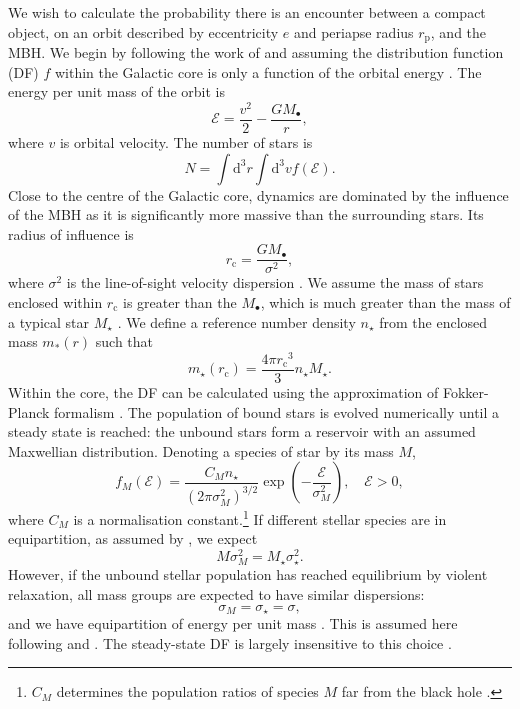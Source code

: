 \documentclass[useAMS,usedcolumn,usegraphicx,usenatbib]{mn2e}
\newcommand{\sub}[1]{\ensuremath{_\mathrm{#1}}}
\newcommand{\dd}{\ensuremath{\mathrm{d}}}
\begin{document}
We wish to calculate the probability there is an encounter between a compact object, on an orbit described by eccentricity $e$ and periapse radius $r\sub{p}$, and the MBH. We begin by following the work of \citet{Bahcall1976, Bahcall1977} and assuming the distribution function (DF) $f$ within the Galactic core is only a function of the orbital energy \citep{Shapiro1978}. The energy per unit mass of the orbit is
\begin{equation}
\mathcal{E} = \frac{v^2}{2} - \frac{GM_\bullet}{r},
\end{equation}
where $v$ is orbital velocity. The number of stars is
\begin{equation}
N = \int \dd^3r \int \dd^3v f(\mathcal{E}).
\end{equation}
Close to the centre of the Galactic core, dynamics are dominated by the influence of the MBH as it is significantly more massive than the surrounding stars. Its radius of influence is
\begin{equation}
r\sub{c} = \frac{GM_\bullet}{\sigma^2},
\label{eq:r_c}
\end{equation}
where $\sigma^2$ is the line-of-sight velocity dispersion \citep{Frank1976}. We assume the mass of stars enclosed within $r\sub{c}$ is greater than the $M_\bullet$, which is much greater than the mass of a typical star $M_\star$ \citep{Bahcall1976}. We define a reference number density $n_\star$ from the enclosed mass $m_\ast(r)$ such that
\begin{equation}
m_\star(r\sub{c}) = \frac{4\pi r\sub{c}^3}{3}n_\star M_\star.
\end{equation}
Within the core, the DF can be calculated using the approximation of Fokker-Planck formalism \citep[section 7.4]{Binney2008}. The population of bound stars is evolved numerically until a steady state is reached: the unbound stars form a reservoir with an assumed Maxwellian distribution. Denoting a species of star by its mass $M$,
\begin{equation}
f_M(\mathcal{E}) = \frac{C_M n_\star}{(2\pi\sigma_M^2)^{3/2}} \exp\left(-\frac{\mathcal{E}}{\sigma_M^2}\right),\quad\mathcal{E} > 0,
\label{eq:Unbound_DF}
\end{equation}
where $C_M$ is a normalisation constant.\footnote{$C_M$ determines the population ratios of species $M$ far from the black hole \citep{Alexander2009}.} If different stellar species are in equipartition, as assumed by \citet{Bahcall1976, Bahcall1977}, we expect
\begin{equation}
M \sigma_M^2 = M_\star \sigma_\star^2.
\end{equation}
However, if the unbound stellar population has reached equilibrium by violent relaxation, all mass groups are expected to have similar dispersions:
\begin{equation}
\sigma_M = \sigma_\star = \sigma,
\end{equation}
and we have equipartition of energy per unit mass \citep{Lynden-Bell1967}. This is assumed here following \citet{Alexander2009} and \citet{O'Leary2009}. The steady-state DF is largely insensitive to this choice \citep{Bahcall1977, Alexander2009}.
\end{document}
